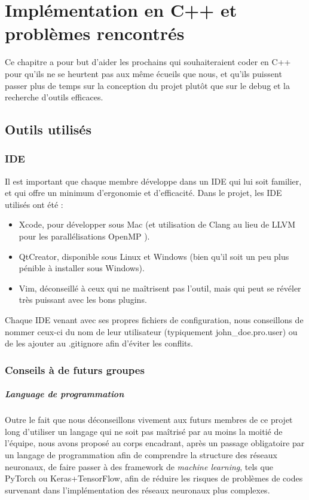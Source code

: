 \chapter{Implémentation en C++ et problèmes rencontrés}

Ce chapitre a pour but d'aider les prochains qui souhaiteraient coder en C++ pour qu'ils ne se heurtent pas aux même écueils que nous, et qu'ils puissent passer plus de temps sur la conception du projet plutôt que sur le debug et la recherche d'outils efficaces.

\section{Outils utilisés}

\subsection{IDE}

Il est important que chaque membre développe dans un IDE qui lui soit familier, et qui offre un minimum d'ergonomie et d'efficacité. Dans le projet, les IDE utilisés ont été :
\begin{itemize}
    \item Xcode, pour développer sous Mac (et utilisation de Clang au lieu de LLVM pour les parallélisations OpenMP \cite{menshov_xcode_2017} ). 
    \item QtCreator, disponible sous Linux et Windows (bien qu'il soit un peu plus pénible à installer sous Windows).
    \item Vim, déconseillé à ceux qui ne maîtrisent pas l'outil, mais qui peut se révéler très puissant avec les bons plugins.
\end{itemize}

Chaque IDE venant avec ses propres fichiers de configuration, nous conseillons de nommer ceux-ci du nom de leur utilisateur (typiquement john\_doe.pro.user) ou de les ajouter au .gitignore afin d'éviter les conflits.

\subsection{Conseils à de futurs groupes}
\paragraph{Language de programmation}
Outre le fait que nous déconseillons vivement aux futurs membres de ce projet long d'utiliser un langage qui ne soit pas maîtrisé par au moins la moitié de l'équipe, nous avons proposé au corps encadrant, après un passage obligatoire par un langage de programmation afin de comprendre la structure des réseaux neuronaux, de faire passer à des framework de \textit{machine learning}, tels que PyTorch ou Keras+TensorFlow, afin de réduire les risques de problèmes de codes survenant dans l'implémentation des réseaux neuronaux plus complexes.
